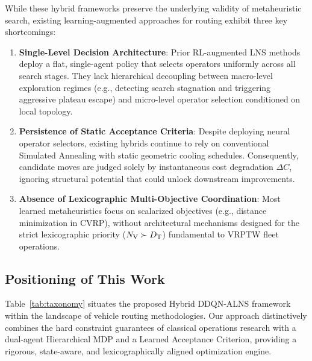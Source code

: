While these hybrid frameworks preserve the underlying validity of metaheuristic search, existing learning-augmented approaches for routing exhibit three key shortcomings:
\begin{enumerate}
    \item \textbf{Single-Level Decision Architecture}: Prior RL-augmented LNS methods deploy a flat, single-agent policy that selects operators uniformly across all search stages. They lack hierarchical decoupling between macro-level exploration regimes (e.g., detecting search stagnation and triggering aggressive plateau escape) and micro-level operator selection conditioned on local topology.
    \item \textbf{Persistence of Static Acceptance Criteria}: Despite deploying neural operator selectors, existing hybrids continue to rely on conventional Simulated Annealing with static geometric cooling schedules. Consequently, candidate moves are judged solely by instantaneous cost degradation $\Delta C$, ignoring structural potential that could unlock downstream improvements.
    \item \textbf{Absence of Lexicographic Multi-Objective Coordination}: Most learned metaheuristics focus on scalarized objectives (e.g., distance minimization in CVRP), without architectural mechanisms designed for the strict lexicographic priority (${N_\mathrm{V}} \succ {D_\mathrm{T}}$) fundamental to VRPTW fleet operations.
\end{enumerate}

\subsection{Positioning of This Work}
\label{sec:rw_positioning}

Table~\ref{tab:taxonomy} situates the proposed Hybrid DDQN-ALNS framework within the landscape of vehicle routing methodologies. Our approach distinctively combines the hard constraint guarantees of classical operations research with a dual-agent Hierarchical MDP and a Learned Acceptance Criterion, providing a rigorous, state-aware, and lexicographically aligned optimization engine.
